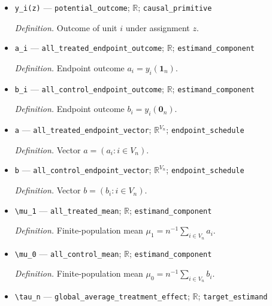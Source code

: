 \documentclass{article}
\begin{document}
\begin{itemize}
  \par\smallskip\noindent\emph{Definition.} \texttt{Fixed finite-\allowbreak{}population potential-\allowbreak{}outcome schedule.}
  \item \texttt{y\_\allowbreak{}i(z)} --- \texttt{potential\_\allowbreak{}outcome}; \(\mathbb R\); \texttt{causal\_\allowbreak{}primitive}
  \par\smallskip\noindent\emph{Definition.} Outcome of unit \(i\) under assignment \(z\).
  \item \texttt{a\_\allowbreak{}i} --- \texttt{all\_\allowbreak{}treated\_\allowbreak{}endpoint\_\allowbreak{}outcome}; \(\mathbb R\); \texttt{estimand\_\allowbreak{}component}
  \par\smallskip\noindent\emph{Definition.} Endpoint outcome \(a_i=y_i(\mathbf 1_n)\).
  \item \texttt{b\_\allowbreak{}i} --- \texttt{all\_\allowbreak{}control\_\allowbreak{}endpoint\_\allowbreak{}outcome}; \(\mathbb R\); \texttt{estimand\_\allowbreak{}component}
  \par\smallskip\noindent\emph{Definition.} Endpoint outcome \(b_i=y_i(\mathbf 0_n)\).
  \item \texttt{a} --- \texttt{all\_\allowbreak{}treated\_\allowbreak{}endpoint\_\allowbreak{}vector}; \(\mathbb R^{V_n}\); \texttt{endpoint\_\allowbreak{}schedule}
  \par\smallskip\noindent\emph{Definition.} Vector \(a=(a_i:i\in V_n)\).
  \item \texttt{b} --- \texttt{all\_\allowbreak{}control\_\allowbreak{}endpoint\_\allowbreak{}vector}; \(\mathbb R^{V_n}\); \texttt{endpoint\_\allowbreak{}schedule}
  \par\smallskip\noindent\emph{Definition.} Vector \(b=(b_i:i\in V_n)\).
  \item \texttt{\textbackslash{}\allowbreak{}mu\_\allowbreak{}1} --- \texttt{all\_\allowbreak{}treated\_\allowbreak{}mean}; \(\mathbb R\); \texttt{estimand\_\allowbreak{}component}
  \par\smallskip\noindent\emph{Definition.} Finite-population mean \(\mu_1=n^{-1}\sum_{i\in V_n}a_i\).
  \item \texttt{\textbackslash{}\allowbreak{}mu\_\allowbreak{}0} --- \texttt{all\_\allowbreak{}control\_\allowbreak{}mean}; \(\mathbb R\); \texttt{estimand\_\allowbreak{}component}
  \par\smallskip\noindent\emph{Definition.} Finite-population mean \(\mu_0=n^{-1}\sum_{i\in V_n}b_i\).
  \item \texttt{\textbackslash{}\allowbreak{}tau\_\allowbreak{}n} --- \texttt{global\_\allowbreak{}average\_\allowbreak{}treatment\_\allowbreak{}effect}; \(\mathbb R\); \texttt{target\_\allowbreak{}estimand}

\end{itemize}
\end{document}
